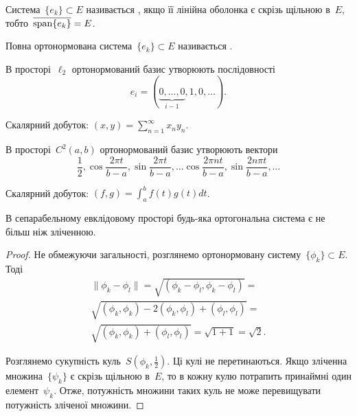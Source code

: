 \begin{definition}
    Система~$\{e_k\} \subset E$ називається , якщо її лінійна оболонка є скрізь щільною в~$E$, тобто~$\overline{\operatorname{span} \{e_k\}} = E$.
\end{definition}

\begin{definition}
    Повна ортонормована система~$\{e_k\} \subset E$ називається .
\end{definition}

\begin{example}
    В просторі~$\ell_2$ ортонормований базис утворюють послідовності
    \begin{equation*}
        e_i = (\underset{i - 1}{\underbrace{0, \dots, 0}}, 1, 0, \dots).
    \end{equation*}
    
    Скалярний добуток: $(x, y) = \sum_{n = 1}^\infty x_n y_n$.
\end{example}

\begin{example}  %
    В просторі~$C^2(a, b)$ ортонормований базис утворюють вектори
    \begin{equation*}
        \frac{1}{2}, \cos \frac{2 \pi t}{b - a}, \sin \frac{2 \pi t}{b - a}, \dots
        \cos \frac{2 \pi n t}{b - a}, \sin \frac{2 n \pi t}{b - a}, \dots
    \end{equation*}
    
    Скалярний добуток: $(f, g) = \int_a^b f(t) g (t) dt$.
\end{example}

\begin{lemma}
    В сепарабельному евклідовому просторі будь-яка ортогональна система є не більш ніж зліченною.
\end{lemma}

\begin{proof}
    Не обмежуючи загальності, розглянемо ортонормовану систему~$\{\phi_k\} \subset E$. Тоді
    \begin{multline*}
        \|\phi_k - \phi_l\| =
        \sqrt{(\phi_k - \phi_l, \phi_k - \phi_l)} = \\
        \sqrt{(\phi_k, \phi_k) - 2 (\phi_k, \phi_l) + (\phi_l, \phi_l)} = \\
        \sqrt{(\phi_k, \phi_k) + (\phi_l, \phi_l)} =
        \sqrt{1 + 1} = \sqrt{2}.
    \end{multline*}
    
    Розглянемо сукупність куль~$S\left( \phi_k, \frac{1}{2} \right)$. Ці кулі не перетинаються. Якщо зліченна множина~$\{\psi_k\}$ є скрізь щільною в~$E$, то в кожну кулю потрапить принаймні один елемент~$\psi_k$. Отже, потужність множини таких куль не може перевищувати потужність зліченої множини. 
\end{proof}

